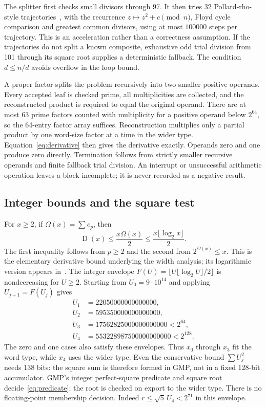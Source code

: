 \documentclass[11pt,a4paper]{article}
\theoremstyle{remark}
\newcommand{\D}{\operatorname{D}}
\begin{document}
The splitter first checks small divisors through 97. It then tries 32
Pollard-rho-style trajectories~\cite{pollard}, with the recurrence $z\mapsto z^2+c\pmod n$,
Floyd cycle comparison and greatest common divisors, using at most $100000$
steps per trajectory. This is an acceleration rather than a correctness
assumption. If the trajectories do not split a known composite, exhaustive
odd trial division from 101 through its square root supplies a deterministic
fallback. The condition $d\le n/d$ avoids overflow in the loop bound.

A proper factor splits the problem recursively into two smaller positive
operands. Every accepted leaf is checked prime, all multiplicities are
collected, and the reconstructed product is required to equal the original
operand. There are at most 63 prime factors counted with multiplicity for
a positive operand below $2^{64}$, so the 64-entry factor array suffices.
Reconstruction multiplies only a partial product by one word-size factor
at a time in the wider type. Equation~\eqref{eq:derivative} then gives the
derivative exactly. Operands zero and one produce zero directly.
Termination follows from strictly smaller recursive operands and finite
fallback trial division. An interrupt or unsuccessful arithmetic operation
leaves a block incomplete; it is never recorded as a negative result.

\subsection{Integer bounds and the square test}
For $x\ge2$, if $\Omega(x)=\sum e_p$, then
\begin{equation}\label{eq:bound}
\D(x)\le \frac{x\Omega(x)}2
\le \frac{x\lfloor\log_2x\rfloor}2.
\end{equation}
The first inequality follows from $p\ge2$ and the second from
$2^{\Omega(x)}\le x$. This is the elementary derivative bound underlying
the width analysis; its logarithmic version appears in~\cite[Theorem 9]{ufnarovski}.
The integer envelope $F(U)=\lfloor U\lfloor\log_2U\rfloor/2\rfloor$ is
nondecreasing for $U\ge2$. Starting from $U_0=9\cdot10^{14}$ and applying
$U_{j+1}=F(U_j)$ gives
\begin{align*}
U_1&=22050000000000000,\\
U_2&=595350000000000000,\\
U_3&=17562825000000000000<2^{64},\\
U_4&=553228987500000000000<2^{128}.
\end{align*}
The zero and one cases also satisfy these envelopes. Thus $x_0$ through
$x_3$ fit the word type, while $x_4$ uses the wider type. Even the conservative
bound $\sum U_j^2$ needs 138 bits: the square sum is therefore formed in GMP,
not in a fixed 128-bit accumulator. GMP's integer perfect-square predicate
and square root~\cite{gmp} decide~\eqref{eq:predicate}; the root is checked
on export to the wider type. There is no floating-point membership decision.
Indeed $r\le\sqrt{5}\,U_4<2^{71}$ in this envelope.
\end{document}
